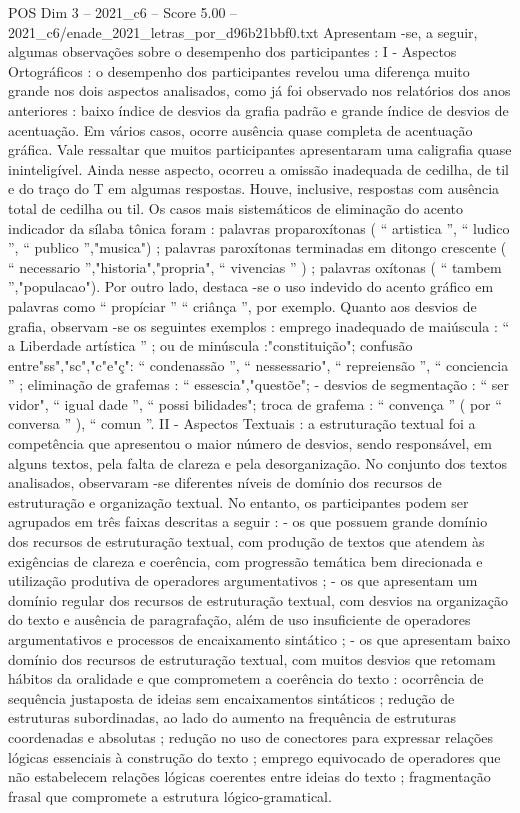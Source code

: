 \begin{textsample}{POS Dim 3 – 2021\_c6 – Score 5.00 – 2021\_c6/enade\_2021\_letras\_por\_d96b21bbf0.txt}
Apresentam -se, a seguir, algumas observações sobre o desempenho dos participantes : I - Aspectos Ortográficos : o desempenho dos participantes revelou uma diferença muito grande nos dois aspectos analisados, como já foi observado nos relatórios dos anos anteriores : baixo índice de desvios da grafia padrão e grande índice de desvios de acentuação.
Em vários casos, ocorre ausência quase completa de acentuação gráfica.
Vale ressaltar que muitos participantes apresentaram uma caligrafia quase ininteligível.
Ainda nesse aspecto, ocorreu a omissão inadequada de cedilha, de til e do traço do T em algumas respostas.
Houve, inclusive, respostas com ausência total de cedilha ou til.
Os casos mais sistemáticos de eliminação do acento indicador da sílaba tônica foram : palavras proparoxítonas ( “ artistica ”, “ ludico ”, “ publico ”,"musica") ; palavras paroxítonas terminadas em ditongo crescente ( “ necessario ”,"historia","propria", “ vivencias ” ) ; palavras oxítonas ( “ tambem ”,"populacao").
Por outro lado, destaca -se o uso indevido do acento gráfico em palavras como “ propíciar ” “ criânça ”, por exemplo.
Quanto aos desvios de grafia, observam -se os seguintes exemplos : emprego inadequado de maiúscula : “ a Liberdade artística ” ; ou de minúscula :"constituição"; confusão entre"ss","sc","c"e"ç": “ condenassão ”, “ nessessario", “ repreiensão ”, “ conciencia ” ; eliminação de grafemas : “ essescia","questõe"; - desvios de segmentação : “ ser vidor", “ igual dade ”, “ possi bilidades"; troca de grafema : “ convença ” ( por “ conversa ” ), “ comun ”.
II - Aspectos Textuais : a estruturação textual foi a competência que apresentou o maior número de desvios, sendo responsável, em alguns textos, pela falta de clareza e pela desorganização.
No conjunto dos textos analisados, observaram -se diferentes níveis de domínio dos recursos de estruturação e organização textual.
No entanto, os participantes podem ser agrupados em três faixas descritas a seguir : - os que possuem grande domínio dos recursos de estruturação textual, com produção de textos que atendem às exigências de clareza e coerência, com progressão temática bem direcionada e utilização produtiva de operadores argumentativos ; - os que apresentam um domínio regular dos recursos de estruturação textual, com desvios na organização do texto e ausência de paragrafação, além de uso insuficiente de operadores argumentativos e processos de encaixamento sintático ; - os que apresentam baixo domínio dos recursos de estruturação textual, com muitos desvios que retomam hábitos da oralidade e que comprometem a coerência do texto : ocorrência de sequência justaposta de ideias sem encaixamentos sintáticos ; redução de estruturas subordinadas, ao lado do aumento na frequência de estruturas coordenadas e absolutas ; redução no uso de conectores para expressar relações lógicas essenciais à construção do texto ; emprego equivocado de operadores que não estabelecem relações lógicas coerentes entre ideias do texto ; fragmentação frasal que compromete a estrutura lógico-gramatical.

\end{textsample}
